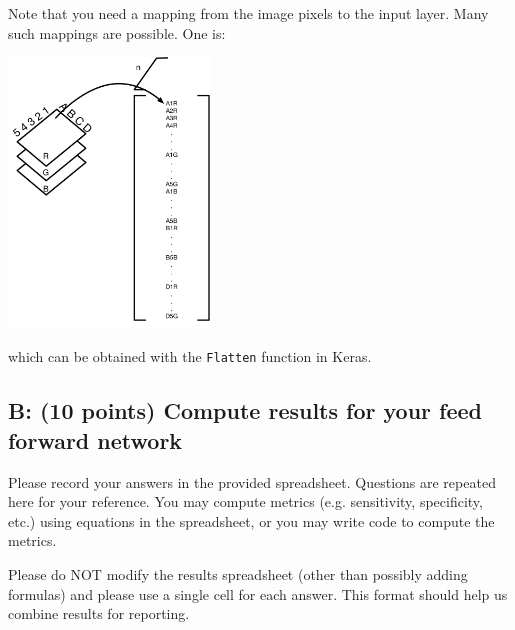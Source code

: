 \documentclass[11pt]{article}
\renewcommand\:{\colon} %
\begin{document}
Note that you need a mapping from the image pixels to the input layer. Many such mappings are possible. One is:

\includegraphics[width=0.4\textwidth]{ffmap.pdf}

which can be obtained with the \texttt{Flatten} function in Keras.



\subsection{B: (10 points) Compute results for your feed forward network}

Please record your answers in the provided spreadsheet. Questions are repeated here for your reference. You may compute metrics (e.g. sensitivity, specificity, etc.) using equations in the spreadsheet, or you may write code to compute the metrics.

Please do NOT modify the results spreadsheet (other than possibly adding formulas) and please use a single cell for each answer.  This format should help us combine results for reporting.
\end{document}
